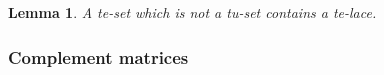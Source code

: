 \documentclass[11pt,a4paper]{amsart}
\theoremstyle{plain}
\newtheorem{lemma}[theorem]{Lemma}
\theoremstyle{definition}
\DeclareMathOperator{\cone}{cone}
\DeclareMathOperator{\eqdet}{eqdet}
\begin{document}
\begin{lemma}\label{containte-lace}
A te-set which is not a tu-set contains a te-lace.
\end{lemma}	
\subsubsection{Complement matrices}
%

\end{document}
